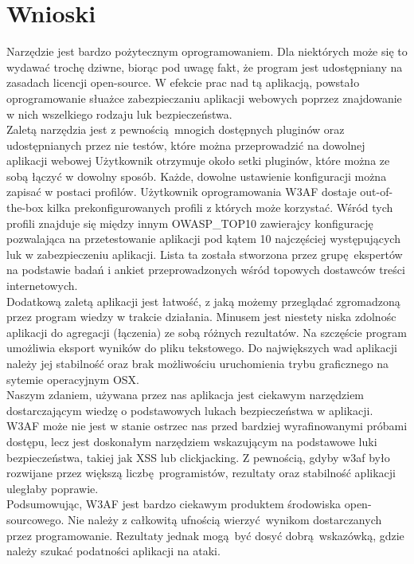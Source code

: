 \chapter{Wnioski}

Narzędzie jest bardzo pożytecznym oprogramowaniem. Dla niektórych może się to wydawać trochę dziwne, biorąc pod uwagę fakt, że program jest udostępniany na zasadach licencji open-source. W efekcie prac nad tą aplikacją, powstało oprogramowanie słuażce zabezpieczaniu aplikacji webowych poprzez znajdowanie w nich wszelkiego rodzaju luk bezpieczeństwa.\\

Zaletą narzędzia jest z pewnością mnogich dostępnych pluginów oraz udostępnianych przez nie testów, które można przeprowadzić na dowolnej aplikacji webowej Użytkownik otrzymuje około setki pluginów, które można ze sobą łączyć w dowolny sposób. Każde, dowolne ustawienie konfiguracji można zapisać w postaci profilów. Użytkownik oprogramowania W3AF dostaje out-of-the-box kilka prekonfigurowanych profili z których może korzystać. Wśród tych profili znajduje się między innym OWASP\_TOP10 zawierajcy konfigurację pozwalająca na przetestowanie aplikacji pod kątem 10 najczęściej występujących luk w zabezpieczeniu aplikacji. Lista ta została stworzona przez grupę ekspertów na podstawie badań i ankiet przeprowadzonych wśród topowych dostawców treści internetowych. \\

Dodatkową zaletą aplikacji jest łatwość, z jaką możemy przeglądać zgromadzoną przez program wiedzy w trakcie działania. Minusem jest niestety niska zdolnośc aplikacji do agregacji (łączenia) ze sobą różnych rezultatów. Na szczęście program umożliwia eksport wyników do pliku tekstowego. Do największych wad aplikacji należy jej stabilność oraz brak możliwościu uruchomienia trybu graficznego na sytemie operacyjnym OSX.\\

Naszym zdaniem, używana przez nas aplikacja jest ciekawym narzędziem dostarczającym wiedzę o podstawowych lukach bezpieczeństwa w aplikacji. W3AF może nie jest w stanie ostrzec nas przed bardziej wyrafinowanymi próbami dostępu, lecz jest doskonałym narzędziem wskazującym na podstawowe luki bezpieczeństwa, takiej jak XSS lub clickjacking. Z pewnością, gdyby w3af było rozwijane przez większą liczbę programistów, rezultaty oraz stabilność aplikacji uległaby poprawie.\\

Podsumowując, W3AF jest bardzo ciekawym produktem środowiska open-sourcowego. Nie należy z całkowitą ufnością wierzyć wynikom dostarczanych przez programowanie. Rezultaty jednak mogą być dosyć dobrą wskazówką, gdzie należy szukać podatności aplikacji na ataki.